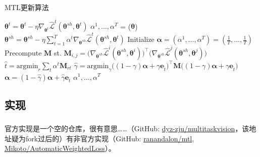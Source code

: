 \documentclass{ctexart}
\begin{document}
\begin{algorithm}[H]
\caption{MTL更新算法}
\label{alg:mtl_mgda}
\begin{algorithmic}[1]
\State $\bm\theta^t = \bm\theta^t - \eta \nabla_{\bm\theta^{t}}  \hat{\mathcal{L}}^t(\bm\theta^{sh},\bm\theta^t)$  
\EndFor
\State $\alpha^1,\ldots,\alpha^{T}$ = ($\bm\theta$) 
\State $\bm\theta^{sh} = \bm\theta^{sh} -   \eta \sum_{t=1}^T \alpha^t \nabla_{\bm\theta^{sh}}  \hat{\mathcal{L}}^t(\bm\theta^{sh},\bm\theta^t)$ 
\Statex
{}
\State Initialize $\bm{\alpha} = (\alpha^1, \ldots, \alpha^{T}) = (\frac{1}{T}, \ldots, \frac{1}{T})$
\State Precompute $\mathbf{M}$ st. $\mathbf{M}_{i,j} = \big(\nabla_{\bm\theta^{sh}}  \hat{\mathcal{L}}^i(\bm\theta^{sh},\bm\theta^i)\big)^\intercal \big(\nabla_{\bm\theta^{sh}}  \hat{\mathcal{L}}^j(\bm\theta^{sh},\bm\theta^j)\big)$
\Repeat
\State $\hat{t} = \mathrm{argmin}_r \sum_t \alpha^t \mathbf{M}_{rt}$
\State $\hat{\gamma} = \mathrm{argmin}_{\gamma}  \big( (1 - \gamma) \bm{\alpha} + \gamma \bm{e}_{\hat{t}}  \big)^\intercal \mathbf{M}  \big( (1 - \gamma) \bm{\alpha} + \gamma \bm{e}_{\hat{t}}  \big)$ 
\State $\bm{\alpha} = (1- \hat{\gamma})\bm{\alpha} + \hat{\gamma} \bm{e}_{\hat{t}}$
 $\alpha^1,\ldots,\alpha^{T}$
\EndProcedure
\end{algorithmic}
\end{algorithm}



\subsection{实现}

\subsubsection{}

官方实现是一个空的仓库，很有意思……（GitHub: \href{https://github.com/dyz-zju/multitaskvision}{dyz-zju/multitaskvision}，该地址疑为fork过后的）有非官方实现（GitHub: \href{https://github.com/ranandalon/mtl}{ranandalon/mtl}, \href{https://github.com/Mikoto10032/AutomaticWeightedLoss}{Mikoto/Automatic\-Weighted\-Loss}）。
\end{document}
